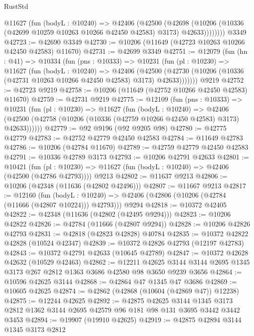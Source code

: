 \begin{lexlean}{RustStd}
\begin{coremodule}
          @11627
            (fun (bodyL : @10240) =>
            @42406
              (@42500
                (@42698
                  (@10206 (@10336 (@42699 @10259 @10263 @10266 @42450 @42583) @3173) @42633))))))))
    @3349
@42723 := @42690 @3349
@42730 := @10206 (@11649 (@42723 @10263 @10266 @42450 @42583) @11670)
@42731 := @42699 @3349
@42751 := @12079
    (fun (hn : @41) =>
    @10334
      (fun (pns : @10333) =>
      @10231
        (fun (pl : @10230) =>
        @11627
          (fun (bodyL : @10240) =>
          @42406
            (@42500
              (@42730 (@10206 (@10336 (@42731 @10263 @10266 @42450 @42583) @3173) @42633)))))))
    @9219
@42752 := @42723 @9219
@42758 := @10206 (@11649 (@42752 @10266 @42450 @42583) @11670)
@42759 := @42731 @9219
@42775 := @12109
    (fun (pns : @10333) =>
    @10231
      (fun (pl : @10230) =>
      @11627
        (fun (bodyL : @10240) =>
        @42406 (@42500 (@42758 (@10206 (@10336 (@42759 @10266 @42450 @42583) @3173) @42633))))))
@42779 := @92 @9196 (@92 @9205 @98)
@42780 := @42775 @42779
@42783 := @42752 @42779 @42450 @42583
@42784 := @11649 @42783
@42786 := @10206 (@42784 @11670)
@42789 := @42759 @42779 @42450 @42583
@42791 := @10336 @42789 @3173
@42793 := @10206 @42791 @42633
@42801 := @10421
    (fun (pl : @10230) => @11627 (fun (bodyL : @10240) => @42406 (@42500 (@42786 @42793))))
    @9213
@42802 := @11637 @9213
@42806 := @10206 (@42348 (@11636 (@42802 @42496)))
@42807 := @11667 @9213
@42817 := @12160
    (fun (bodyL : @10240) => @42406 (@42806 (@10206 (@42784 (@11666 (@42807 @10224))) @42793)))
    @9294
@42818 := @10372 @42405
@42822 := @42348 (@11636 (@42802 (@42495 @9294)))
@42823 := @10206 @42822
@42826 := @42784 (@11666 (@42807 @9294))
@42828 := @10206 @42826 @42793
@42831 := @42818 (@42823 @42828) @40784
@42835 := @10372 @42822 @42828 (@10524 @42347)
@42839 := @10372 @42826 @42793 (@12197 @42783)
@42843 := @10372 @42791 @42633 (@10645 @42789)
@42847 := @10372 @42628 @42632 (@10529 @42463)
@42862 := @12211
    @42625
    @3144
    @3144
    @2695
    @1345
    @3173
    @267
    @2812
    @1363
    @3686
    @42580
    @98
    @3650
    @9239
    @3656
@42864 := @10596 @42625 @3144
@42868 := @42864 @47 @1345 @47 @3686
@42869 := @10605 @42625
@42874 := @42862 (@42868 (@10604 (@42869 @47)) @12238)
@42875 := @12244 @42625
@42892 := @42875
    @42625
    @3144
    @1345
    @3173
    @2812
    @1362
    @3144
    @2695
    @42579
    @96
    @181
    @98
    @131
    @3695
    @3442
    @3442
    @3453
@42894 := @19907 (@19910 @42625)
@42919 := @42875
    @42894
    @3144
    @1345
    @3173
    @2812

\end{coremodule}
\end{lexlean}
